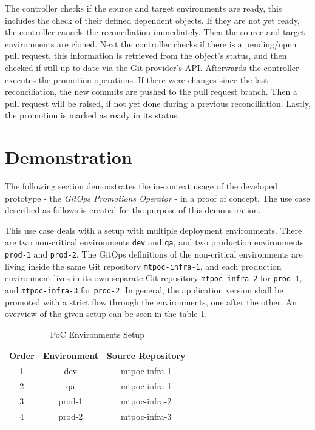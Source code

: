 The controller checks if the source and target environments are ready,
this includes the check of their defined dependent objects.
If they are not yet ready, the controller cancels the reconciliation immediately.
Then the source and target environments are cloned.
Next the controller checks if there is a pending/open pull request,
this information is retrieved from the object's status, and then checked
if still up to date via the Git provider's API.
Afterwards the controller executes the promotion operations.
If there were changes since the last reconciliation, the new commits
are pushed to the pull request branch.
Then a pull request will be raised, if not yet done during a previous reconciliation.
Lastly, the promotion is marked as ready in its status.















\section{Demonstration}
\label{prototype:demonstration}

The following section demonstrates the in-context usage of the
developed prototype - the \textit{GitOps Promotions Operator} - in a proof of concept.
The use case described as follows is created for the purpose of this demonstration.

This use case deals with a setup with multiple deployment environments.
There are two non-critical environments \lstinline|dev| and \lstinline|qa|,
and two production environments \lstinline|prod-1| and \lstinline|prod-2|.
The GitOps definitions of the non-critical environments are living inside the same
Git repository \lstinline|mtpoc-infra-1|,
and each production environment lives in its own separate Git repository
\lstinline|mtpoc-infra-2| for \lstinline|prod-1|,
and \lstinline|mtpoc-infra-3| for \lstinline|prod-2|.
In general, the application version shall be promoted with a strict flow
through the environments, one after the other.
An overview of the given setup can be seen in the table \ref{table:poc-environments-setup}.

\begin{table}[h]
\begin{center}
	\begin{tabular}{||c c c||} 
		\hline
		Order & Environment & Source Repository \\ [0.5ex] 
		\hline\hline
		1 & dev & mtpoc-infra-1 \\ 
		\hline
		2 & qa & mtpoc-infra-1 \\
		\hline
		3 & prod-1 & mtpoc-infra-2 \\
		\hline
		4 & prod-2 & mtpoc-infra-3 \\
		\hline
	\end{tabular}
	\caption{PoC Environments Setup}
	\label{table:poc-environments-setup}
\end{center}
\end{table}

